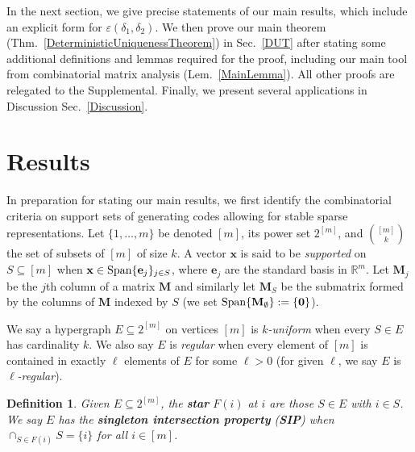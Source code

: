 \documentclass[9pt,twocolumn]{pnas-new}
\newtheorem{definition}{Definition}
\begin{document}
In the next section, we give precise statements of our main results, which include an explicit form for $\varepsilon(\delta_1, \delta_2)$. We then prove our main theorem (Thm.~\ref{DeterministicUniquenessTheorem}) in Sec.~\ref{DUT} after stating some additional definitions and lemmas required for the proof, including our main tool from combinatorial matrix analysis (Lem.~\ref{MainLemma}). All other proofs are relegated to the Supplemental. 
Finally, we present several applications in Discussion Sec.~\ref{Discussion}.

\section{Results}

In preparation for stating our main results, we first identify the combinatorial criteria on support sets of generating codes allowing for stable sparse 
representations.  Let $\{1, \ldots, m\}$ be denoted $[m]$, its power set $2^{[m]}$, and ${[m] \choose k}$ the set of subsets of $[m]$ of size $k$. 
A vector $\mathbf{x}$ is said to be \emph{supported} on $S \subseteq [m]$ %
when $\mathbf{x} \in \text{\rm Span} \{\mathbf{e}_j\}_{j\in S}$, where $\mathbf{e}_j$ are the standard basis in $\mathbb R^m$.  Let $\mathbf{M}_j$ be the $j$th column of a matrix $\mathbf{M}$ and similarly let $\mathbf{M}_S$ be the submatrix formed by the columns of $\mathbf{M}$ indexed by $S$ (we set $\text{\rm Span}\{\mathbf{M}_\emptyset\} := \{\textbf{0}\}$).  

We say a hypergraph $E \subseteq 2^{[m]}$ on vertices $[m]$ is \textit{$k$-uniform} when every $S \in E$ has cardinality $k$. We also say $E$ is \emph{regular} when every element of $[m]$ is contained in exactly $\ell$ elements of $E$ for some $\ell > 0$ (for given $\ell$, we say $E$ is \textit{$\ell$-regular}).

\begin{definition}\label{sip}
Given $E \subseteq 2^{[m]}$, the \textbf{star} $F(i)$ at $i$ are those $S \in E$ with $i \in S$. We say $E$ has the \textbf{singleton intersection property} (\textbf{SIP}) when $\cap_{S \in F(i)} S = \{i\}$ for all $i \in [m]$. 
\end{definition}
\end{document}
